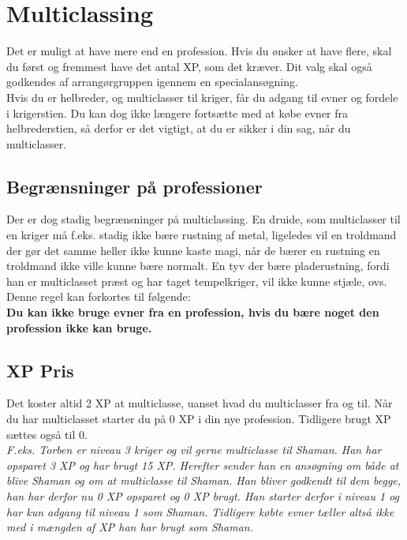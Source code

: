 \section{Multiclassing}
Det er muligt at have mere end en profession. Hvis du ønsker at have flere, skal du først og fremmest have det antal XP, som det kræver. Dit valg skal også godkendes af arrangørgruppen igennem en specialansøgning.\\
Hvis du er helbreder, og multiclasser til kriger, får du adgang til evner og fordele i krigerstien. Du kan dog ikke længere fortsætte med at købe evner fra helbrederstien, så derfor er det vigtigt, at du er sikker i din sag, når du multiclasser.

\subsection{Begrænsninger på professioner}
Der er dog stadig begrænsninger på multiclassing. En druide, som multiclasser til en kriger må f.eks. stadig ikke bære rustning af metal, ligeledes vil en troldmand der gør det samme heller ikke kunne kaste magi, når de bærer en rustning en troldmand ikke ville kunne bære normalt. En tyv der bære pladerustning, fordi han er multiclasset præst og har taget tempelkriger, vil ikke kunne stjæle, ovs.\\
Denne regel kan forkortes til følgende:\\
\textbf{Du kan ikke bruge evner fra en profession, hvis du bære noget den profession ikke kan bruge.}\\

\subsection{XP Pris}
Det koster altid 2 XP at multiclasse, uanset hvad du multiclasser fra og til. Når du har multiclasset starter du på 0 XP i din nye profession. Tidligere brugt XP sættes også til 0.\\
\textit{F.eks. Torben er niveau 3 kriger og vil gerne multiclasse til Shaman. Han har opsparet 3 XP og har brugt 15 XP. Herefter sender han en ansøgning om både at blive Shaman og om at multiclasse til Shaman. Han bliver godkendt til dem begge, han har derfor nu 0 XP opsparet og 0 XP brugt. Han starter derfor i niveau 1 og har kun adgang til niveau 1 som Shaman. Tidligere købte evner tæller altså ikke med i mængden af XP han har brugt som Shaman.}
